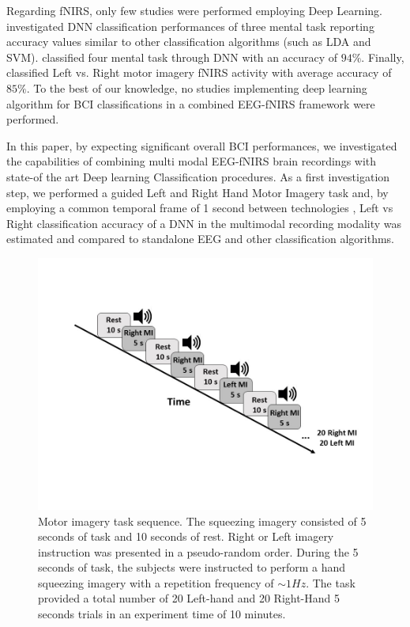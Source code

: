 \documentclass[12pt ]{iopart}
\begin{document}
Regarding fNIRS, only  few  studies were performed employing Deep Learning.  \textcite{hennrich2015investigating} investigated DNN classification performances of three mental task reporting accuracy values similar  to other classification algorithms (such as LDA and SVM).  \textcite{abibullaev2011neural} classified four mental task through DNN with an accuracy of $94\%$. Finally, \textcite{nguyen2013temporal} classified Left vs. Right motor imagery fNIRS activity with average accuracy of $85\%$. To the best of our knowledge, no studies implementing deep learning algorithm for BCI classifications  in a combined EEG-fNIRS framework were performed.

In this paper, by expecting significant overall BCI performances,  we investigated the capabilities of combining multi modal EEG-fNIRS brain recordings  with state-of the art Deep learning Classification procedures. As a first investigation step, we performed a guided Left and Right Hand Motor Imagery task \parencite{pfurtscheller1997motor} and, by employing a common temporal frame of 1 second between technologies \parencite{govindan2016novel}, Left vs Right classification accuracy of a DNN in the multimodal recording modality was estimated and compared to standalone EEG and other classification algorithms. 

\begin{figure}
	\includegraphics[width=\linewidth]{Slide1.JPG}
	\caption{ Motor imagery task sequence. The 
		squeezing imagery consisted of 5 seconds of task and 10 seconds of rest. Right or Left imagery instruction was presented in a pseudo-random order.  During the 5 seconds of task, the subjects were instructed to perform a hand squeezing imagery with a repetition frequency of $\sim1Hz$. The task provided a total number of 20 Left-hand and 20 Right-Hand 5 seconds trials in an experiment time of 10 minutes. }
	\label{fig:fig1}
\end{figure}
\end{document}
